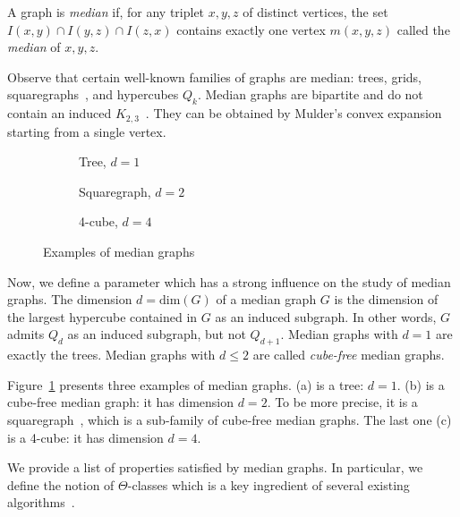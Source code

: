 \documentclass[a4paper,UKenglish,numberwithinsect,cleveref, autoref]{lipics-v2021}
\begin{document}
\begin{definition}
A graph is \textit{median} if, for any triplet $x,y,z$ of distinct vertices, the set $I(x,y) \cap I(y,z) \cap I(z,x)$ contains exactly one vertex $m(x,y,z)$ called the \emph{median} of $x,y,z$.
\label{def:median}
\end{definition}

Observe that certain well-known families of graphs are median: trees, grids, squaregraphs~\cite{BaChEp10}, and hypercubes $Q_k$.
Median graphs are bipartite and do not contain an induced $K_{2,3}$~\cite{BaCh08,HaImKl11,Mu78}. They can be obtained by Mulder's convex expansion~\cite{Mu78,Mu80} starting from a single vertex.

\begin{figure}[h]

\begin{subfigure}[b]{0.32\columnwidth}
\centering
\scalebox{0.6}{}
\caption{Tree, $d=1$}
\end{subfigure}
\begin{subfigure}[b]{0.32\columnwidth}
\centering
\scalebox{0.6}{}
\caption{Squaregraph, $d=2$}
\end{subfigure}
\begin{subfigure}[b]{0.32\columnwidth}
\centering
\scalebox{0.6}{}
\caption{4-cube, $d=4$}
\end{subfigure}

\caption{Examples of median graphs}
\label{fig:median_examples}
\end{figure}

Now, we define a parameter which has a strong influence on the study of median graphs.
The dimension $d = \mbox{dim}(G)$ of a median graph $G$ is the dimension of the largest hypercube contained in $G$ as an induced subgraph.
In other words, $G$ admits $Q_d$ as an induced subgraph, but not $Q_{d+1}$. Median graphs with $d=1$ are exactly the trees. Median graphs with $d\le 2$ are called \textit{cube-free} median graphs.

Figure~\ref{fig:median_examples} presents three examples of median graphs. (a) is a tree: $d=1$. (b) is a cube-free median graph: it has dimension $d=2$. To be more precise, it is a squaregraph~\cite{BaChEp10}, which is a sub-family of cube-free median graphs. The last one (c) is a 4-cube: it has dimension $d=4$. 

We provide a list of properties satisfied by median graphs. In particular, we define the notion of $\Theta$-classes which is a key ingredient of several existing algorithms~\cite{BeChChVa20,HaImKl99,ImKlMu99}.
\end{document}
